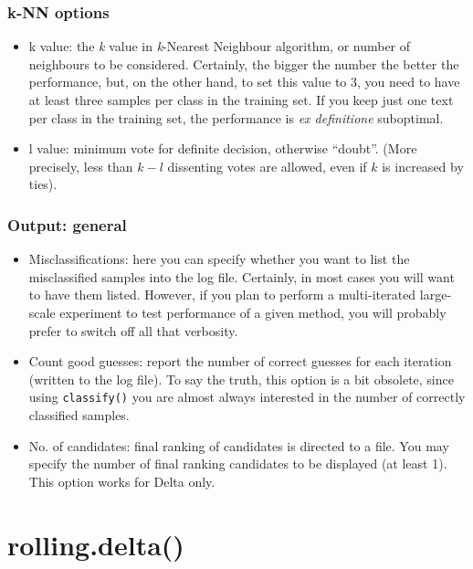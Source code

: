 \documentclass[11pt,a4paper]{article}
\def\margin#1{\marginpar{\textcolor{blue}{\footnotesize\tt #1}}}
\def\code#1{{\tt #1}}
\begin{document}
\subsubsection{k-NN options}
\begin{itemize}
\item k value:\margin{k.value=}\margin{<integer>} the \textit{k} value
in \textit{k}-Nearest Neighbour algorithm, or number of neighbours
to be considered. Certainly, the bigger the number the better the
performance, but, on the other hand, to set this value to 3, you need
to have at least three samples per class in the training set. If you
keep just one text per class in the training set, the performance
is \textit{ex definitione} suboptimal. 
\item l value:\margin{l.value=}\margin{<integer>} minimum vote for
definite decision, otherwise ``doubt''. (More precisely, less than
$k-l$ dissenting votes are allowed, even if $k$ is increased by
ties). 
\end{itemize}

\subsubsection{Output: general}
\begin{itemize}
\item Misclassifications:\margin{final.ranking.of.}\margin{candidates=}\margin{TRUE|FALSE}
here you can specify whether you want to list the misclassified samples
into the log file. Certainly, in most cases you will want to have
them listed. However, if you plan to perform a multi-iterated large-scale
experiment to test performance of a given method, you will probably
prefer to switch off all that verbosity. 
\item Count good guesses:\margin{how.many.correct.}\margin{attributions=}\margin{TRUE|FALSE}
report the number of correct guesses for each iteration (written to
the log file). To say the truth, this option is a bit obsolete, since
using \code{classify()} you are almost always interested in the
number of correctly classified samples. 
\item No. of candidates:\margin{number.of.candidates=}\margin{<integer>}
final ranking of candidates is directed to a file. You may specify
the number of final ranking candidates to be displayed (at least 1).
This option works for Delta only. 
\end{itemize}

\section{rolling.delta()}
\end{document}

